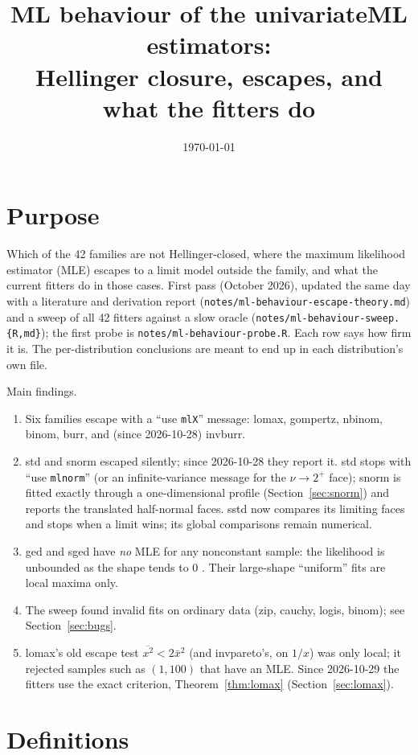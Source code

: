 \documentclass[11pt]{article}
\title{ML behaviour of the univariateML estimators:\\ Hellinger closure, escapes, and what the fitters do}
\author{}
\date{\today}
\newcommand{\code}[1]{\texttt{#1}}
\theoremstyle{plain}
\theoremstyle{definition}
\theoremstyle{remark}
\begin{document}
\maketitle

\section*{Purpose}

Which of the 42 families are not Hellinger-closed, where the maximum
likelihood estimator (MLE) escapes to a limit model outside the family, and
what the current fitters do in those cases. First pass (October 2026),
updated the same day with a literature and derivation report
(\code{notes/ml-behaviour-escape-theory.md}) and a sweep of all 42 fitters
against a slow oracle (\code{notes/ml-behaviour-sweep.\{R,md\}}); the first
probe is \code{notes/ml-behaviour-probe.R}. Each row says how firm it is. The
per-distribution conclusions are meant to end up in each distribution's own
file.

Main findings.
\begin{enumerate}
  \item Six families escape with a ``use \code{mlX}'' message: lomax,
    gompertz, nbinom, binom, burr, and (since 2026-10-28) invburr.
  \item std and snorm escaped silently; since 2026-10-28 they report it.
    std stops with ``use \code{mlnorm}'' (or an infinite-variance message
    for the $\nu\to2^+$ face); snorm is fitted exactly through a
    one-dimensional profile (Section~\ref{sec:snorm}) and reports the
    translated half-normal faces. sstd now compares its limiting faces and
    stops when a limit wins; its global comparisons remain numerical.
  \item ged and sged have \emph{no} MLE for any nonconstant sample: the
    likelihood is unbounded as the shape tends to $0$ \cite{tumlinson2015}.
    Their large-shape ``uniform'' fits are local maxima only.
  \item The sweep found invalid fits on ordinary data (zip, cauchy, logis,
    binom); see Section~\ref{sec:bugs}.
  \item lomax's old escape test $\overline{x^2} < 2\bar x^2$ (and
    invpareto's, on $1/x$) was only local; it rejected samples such as
    $(1, 100)$ that have an MLE. Since 2026-10-29 the fitters use the exact
    criterion, Theorem~\ref{thm:lomax} (Section~\ref{sec:lomax}).
\end{enumerate}

\section{Definitions}
\end{document}
